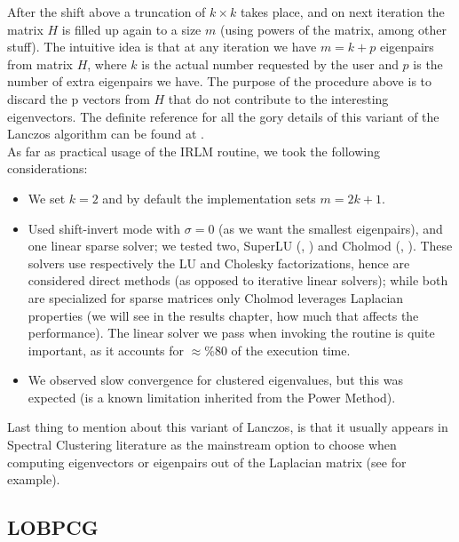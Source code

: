 After the shift above a truncation of $k \times k$ takes place, and on
next iteration the matrix $H$ is filled up again to a size $m$ (using
powers of the matrix, among other stuff). The intuitive idea is that
at any iteration we have $m = k + p$ eigenpairs from matrix $H$, where
$k$ is the actual number requested by the user and $p$ is the number
of extra eigenpairs we have. The purpose of the procedure above is to 
discard the p vectors from $H$ that do not contribute to the
interesting eigenvectors. The definite reference for all the gory
details of this variant of the Lanczos algorithm can be found at
\cite{arpack}. \\

As far as practical usage of the IRLM routine, we took the following
considerations:

\begin{itemize}
\item We set $k=2$ and by default the implementation sets $m=2k+1$.
\item Used shift-invert mode with $\sigma=0$ (as we want the smallest
  eigenpairs), and one linear sparse solver; we tested two, SuperLU
  (\cite{superlu97}, \cite{superlu05}) and  Cholmod (\cite{cholmod08},
  \cite{cholmod08a}). These solvers use respectively the LU and
  Cholesky factorizations, hence are considered direct
  methods (as opposed to iterative linear solvers); while
  both are specialized for sparse matrices only Cholmod leverages
  Laplacian properties (we will see in the results chapter, how much
  that affects the performance). The linear solver we pass when invoking the
  routine is quite important, as it accounts for $\approx \%80$ of
  the execution time.
\item We observed slow convergence for clustered eigenvalues, but this
  was expected (is a known limitation inherited from the Power
  Method).
\end{itemize}

Last thing to mention about this variant of Lanczos, is that it
usually appears in Spectral Clustering literature as the mainstream
option to choose when computing eigenvectors or eigenpairs out of the
Laplacian matrix (see \cite{luxburg07} for example). 

\subsection{LOBPCG}

